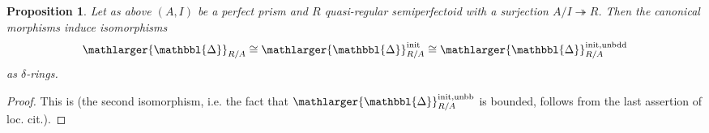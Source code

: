 \documentclass{amsart}
\newcommand{\prism}{{\mathlarger{\mathbbl{\Delta}}}}
\theoremstyle{plain}
\newtheorem{proposition}[theorem]{Proposition}
\theoremstyle{definition}
\newcommand{\blue}[1]{{\color{black}#1}}
\begin{document}
\begin{proposition}
  \label{sec:prism-cohom-quasi-proposition-all-prisms-agree-for-quasi-regular semiperfectoid}
  Let as above $(A,I)$ be a perfect prism and $R$ quasi-regular semiperfectoid with a surjection $A/I\twoheadrightarrow R$. Then the canonical morphisms induce isomorphisms
  $$
  \prism_{R/A}\cong \prism_{R/A}^{\mathrm{init}}\cong \prism_{R/A}^{\mathrm{init, unbdd}}
  $$
  as $\delta$-rings.
\end{proposition}
\begin{proof}
\blue{This is \cite[Proposition 7.10]{bhatt_scholze_prisms_and_prismatic_cohomology} (the second isomorphism, i.e. the fact that $\prism_{R/A}^{\mathrm{init, unbb}}$ is bounded, follows from the last assertion of loc. cit.).}

\end{proof}
\end{document}
